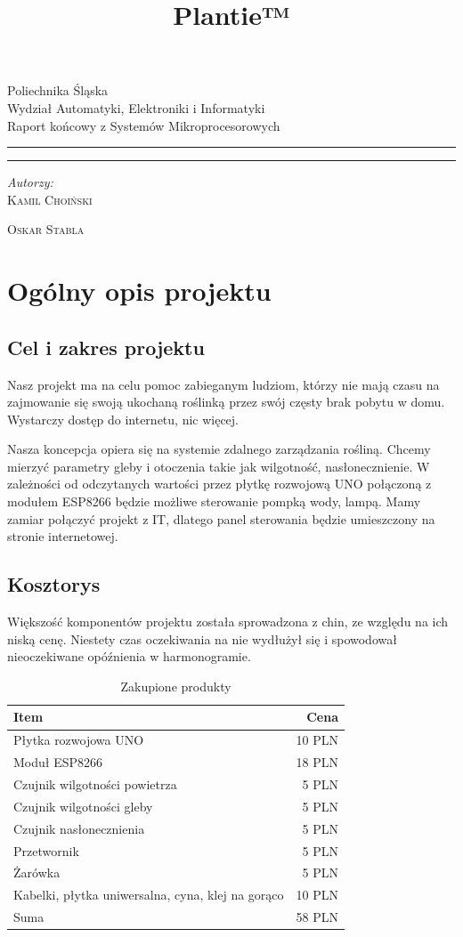 \documentclass[12pt]{article}
\title{Plantie™}
\makeatletter
\newcommand{\linia}{\rule{\linewidth}{0.4mm}}
\renewcommand{\maketitle}{\begin{titlepage}
		\vspace*{1cm}
		\begin{center}\small
			Poliechnika Śląska\\
			Wydział Automatyki, Elektroniki i Informatyki\\
			Raport końcowy z Systemów Mikroprocesorowych
		\end{center}
		\vspace{3cm}
		\noindent\linia
		\begin{center}
			\LARGE \textsc{\@title}
		\end{center}
		\linia
		\vspace{0.5cm}
		\begin{flushright}
			\begin{minipage}{15cm}
				\textit{\small Autorzy:}\\
				\normalsize \textsc{Kamil Choiński} \par \textsc{Oskar Stabla} \par
			\end{minipage}	
		\end{flushright}
		\vspace*{\stretch{6}}
		\begin{center}
			\@date
		\end{center}
	\end{titlepage}
}
\makeatother
\begin{document}
\maketitle

\tableofcontents


\section{Ogólny opis projektu}


\subsection{Cel i zakres projektu}
Nasz projekt ma na celu pomoc zabieganym ludziom, którzy nie mają czasu na zajmowanie się
swoją ukochaną roślinką przez swój częsty brak pobytu w domu. Wystarczy dostęp do internetu,
nic więcej.

Nasza koncepcja opiera się na systemie zdalnego zarządzania rośliną. Chcemy mierzyć parametry
gleby i otoczenia takie jak wilgotność, nasłonecznienie. W zależności od odczytanych wartości przez
płytkę rozwojową UNO połączoną z modułem ESP8266 będzie możliwe sterowanie pompką wody,
lampą. Mamy zamiar połączyć projekt z IT, dlatego panel sterowania będzie umieszczony na stronie
internetowej.


\subsection{Kosztorys}
Większość komponentów projektu została sprowadzona z chin, ze względu na ich niską cenę. Niestety czas oczekiwania na nie wydłużył się i spowodował nieoczekiwane opóźnienia w harmonogramie.

\begin{table}[!h]
\centering
\begin{tabular}{l|r}
Item & Cena \\\hline
Płytka rozwojowa UNO & 10 PLN \\
Moduł ESP8266 & 18 PLN \\

Czujnik wilgotności powietrza & 5 PLN \\

Czujnik wilgotności gleby & 5 PLN \\

Czujnik nasłonecznienia & 5 PLN \\

Przetwornik & 5 PLN \\

Żarówka & 5 PLN \\

Kabelki, płytka uniwersalna, cyna, klej na gorąco & 10 PLN 
\\ \hline
Suma & 58 PLN

\end{tabular}
\caption{\label{tab:widgets}Zakupione produkty}
\end{table}
\end{document}
